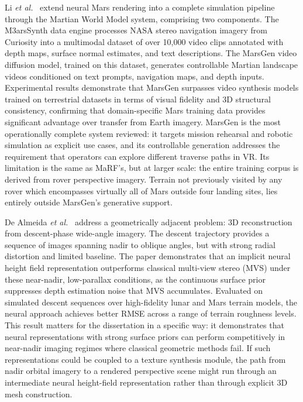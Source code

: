 \documentclass[10pt,journal]{IEEEtran}
\begin{document}
Li \textit{et al.}~\cite{li2025martian} extend neural Mars rendering into a
complete simulation pipeline through the Martian World Model system, comprising
two components. The M3arsSynth data engine processes NASA stereo navigation
imagery from Curiosity into a multimodal dataset of over 10,000 video clips
annotated with depth maps, surface normal estimates, and text descriptions.
The MarsGen video diffusion model, trained on this dataset, generates
controllable Martian landscape videos conditioned on text prompts, navigation
maps, and depth inputs. Experimental results demonstrate that MarsGen surpasses
video synthesis models trained on terrestrial datasets in terms of visual fidelity
and 3D structural consistency, confirming that domain-specific Mars training data
provides significant advantage over transfer from Earth imagery. MarsGen is the
most operationally complete system reviewed: it targets mission rehearsal and
robotic simulation as explicit use cases, and its controllable generation
addresses the requirement that operators can explore different traverse paths
in VR. Its limitation is the same as MaRF's, but at larger scale: the entire
training corpus is derived from rover perspective imagery. Terrain not previously
visited by any rover which encompasses virtually all of Mars outside four
landing sites, lies entirely outside MarsGen's generative support.

De Almeida \textit{et al.}~\cite{dealmeida2025neural3d} address a
geometrically adjacent problem: 3D reconstruction from descent-phase wide-angle
imagery. The descent trajectory provides a sequence of images spanning nadir to
oblique angles, but with strong radial distortion and limited baseline. The
paper demonstrates that an implicit neural height field representation
outperforms classical multi-view stereo (MVS) under these near-nadir, low-parallax
conditions, as the continuous surface prior suppresses depth estimation noise
that MVS accumulates. Evaluated on simulated descent sequences over high-fidelity
lunar and Mars terrain models, the neural approach achieves better RMSE across
a range of terrain roughness levels. This result matters for the dissertation in
a specific way: it demonstrates that neural representations with strong surface
priors can perform competitively in near-nadir imaging regimes where classical
geometric methods fail. If such representations could be coupled to a texture
synthesis module, the path from nadir orbital imagery to a rendered perspective
scene might run through an intermediate neural height-field representation
rather than through explicit 3D mesh construction.
\end{document}
